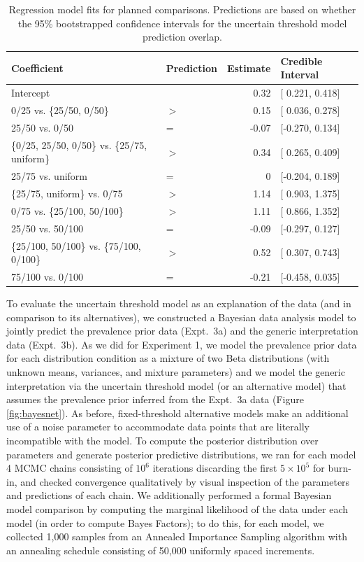 \documentclass[floatsintext,man]{apa6}
\begin{document}
\begin{table}[h]
\centering
\begingroup\fontsize{10pt}{11pt}\selectfont
\begin{tabular}{llrl}
  \hline
Coefficient & Prediction & Estimate & Credible Interval \\ 
  \hline
Intercept &  & 0.32 & [ 0.221, 0.418] \\ 
  0/25 vs. \{25/50, 0/50\} & $>$ & 0.15 & [ 0.036, 0.278] \\ 
  25/50 vs. 0/50 & = & -0.07 & [-0.270, 0.134] \\ 
  \{0/25, 25/50, 0/50\} vs. \{25/75, uniform\} & $>$ & 0.34 & [ 0.265, 0.409] \\ 
  25/75 vs. uniform & = & 0 & [-0.204, 0.189] \\ 
  \{25/75, uniform\} vs. 0/75 & $>$ & 1.14 & [ 0.903, 1.375] \\ 
  0/75 vs. \{25/100, 50/100\} & $>$ & 1.11 & [ 0.866, 1.352] \\ 
  25/50 vs. 50/100 & = & -0.09 & [-0.297, 0.127] \\ 
  \{25/100, 50/100\} vs. \{75/100, 0/100\} & $>$ & 0.52 & [ 0.307, 0.743] \\ 
  75/100 vs. 0/100 & = & -0.21 & [-0.458, 0.035] \\ 
   \hline
\end{tabular}
\endgroup
\caption{Regression model fits for planned comparisons. Predictions are based on whether the 95\% bootstrapped confidence intervals for the uncertain threshold model prediction overlap.} 
\label{tab:regResults}
\end{table}

To evaluate the uncertain threshold model as an explanation of the data (and in comparison to its alternatives), we constructed a Bayesian data analysis model to jointly predict the prevalence prior data (Expt.~3a) and the generic interpretation data (Expt.~3b).
As we did for Experiment 1, we model the prevalence prior data for each distribution condition as a mixture of two Beta distributions (with unknown means, variances, and mixture parameters) and we model the generic interpretation via the uncertain threshold model (or an alternative model) that assumes the prevalence prior inferred from the Expt.~3a data (Figure \ref{fig:bayesnet}).
As before, fixed-threshold alternative models make an additional use of a noise parameter to accommodate data points that are literally incompatible with the model. 
To compute the posterior distribution over parameters and generate posterior predictive distributions, we ran for each model 4 MCMC chains consisting of $10^6$ iterations discarding the first $5 \times 10^5$ for burn-in, and checked convergence qualitatively by visual inspection of the parameters and predictions of each chain. 
We additionally performed a formal Bayesian model comparison by computing the marginal likelihood of the data under each model (in order to compute Bayes Factors); to do this, for each model, we collected 1,000 samples from an Annealed Importance Sampling algorithm with an annealing schedule consisting of 50,000 uniformly spaced increments. 
\end{document}
